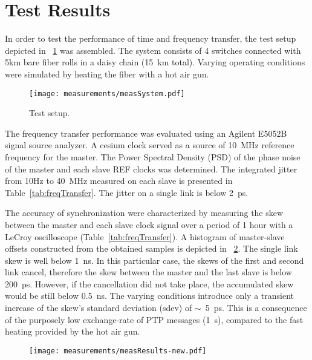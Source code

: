 \section{Test Results}

In order to test the performance of time and frequency transfer, the 
test setup depicted in \figurename~\ref{fig:testSetup} was assembled.
The system consists of 4 switches connected with 5km bare fiber rolls in 
a daisy chain (15~km total). Varying operating conditions were simulated
by heating the fiber with a hot air gun. 


\begin{figure}[!t]
\centering
\texttt{[image: measurements/measSystem.pdf]}
\caption{Test setup.}
\label{fig:testSetup}
\end{figure}


The frequency transfer performance was evaluated using an Agilent E5052B signal source analyzer. 
A cesium clock served as a source of 10~MHz reference frequency for the master.
The Power Spectral Density (PSD) of the phase noise of the master and each slave 
REF clocks was determined. The integrated jitter from 10Hz to 40~MHz measured on each 
slave is presented in Table~\ref{tab:freqTransfer}. The jitter on a single link is below 2~ps. 

The accuracy  of synchronization %
were characterized by measuring the skew between 
the master and each slave clock signal over a period of 1 hour with a LeCroy oscilloscope
(Table~\ref{tab:freqTransfer}). A histogram of master-slave offsets constructed from the obtained
samples is depicted in \figurename~\ref{fig:offset}. The single link skew is
well below 1~ns. In this particular case, the skews of the first and second link cancel,
therefore the skew between the master and the last slave is below 200~ps. However, if the
cancellation did not take place, the accumulated skew would be still below 0.5~ns. The varying
conditions introduce only a transient increase of the skew's standard deviation (sdev) of 
$\sim$~5~ps. This is a consequence of the purposely %
low exchange-rate of PTP messages (1~s), compared
to the fast heating provided by the hot air gun.
\begin{figure}[!t]
\centering
\texttt{[image: measurements/measResults-new.pdf]}
\caption{}
\label{fig:offset}
\end{figure}

